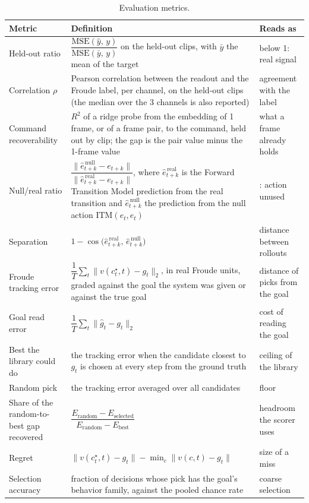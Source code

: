\documentclass[12pt,a4paper,oneside]{report}
\begin{document}
\begin{table}[H]
\centering
\footnotesize
\setlength{\tabcolsep}{6pt}
\renewcommand{\arraystretch}{1.5}
\caption{Evaluation metrics.}
\label{tab:eval-metrics}
\begin{tabularx}{\textwidth}{>{\hsize}Y>{\hsize}Y>{\hsize}Y}
\toprule
\textbf{Metric} & \textbf{Definition} & \textbf{Reads as}\\
\midrule
Held-out ratio & $\dfrac{\mathrm{MSE}(\hat y,\, y)}{\mathrm{MSE}(\bar y,\, y)}$ on the held-out clips, with $\bar y$ the mean of the target & below 1: real signal\\
\addlinespace[3pt]
Correlation $\rho$ & Pearson correlation between the readout and the Froude label, per channel, on the held-out clips (the median over the 3 channels is also reported) & agreement with the label\\
\addlinespace[3pt]
Command recoverability & $R^2$ of a ridge probe from the embedding of 1 frame, or of a frame pair, to the command, held out by clip; the gap is the pair value minus the 1-frame value & what a frame already holds\\
\addlinespace[3pt]
Null/real ratio & $\dfrac{\lVert \hat e^{\,\mathrm{null}}_{t+k} - e_{t+k}\rVert}{\lVert \hat e^{\,\mathrm{real}}_{t+k} - e_{t+k}\rVert}$, where $\hat e^{\,\mathrm{real}}_{t+k}$ is the Forward Transition Model prediction from the real transition and $\hat e^{\,\mathrm{null}}_{t+k}$ the prediction from the null action $\mathrm{ITM}(e_t, e_t)$ & 1.0: action unused\\
\addlinespace[3pt]
Separation & $1-\cos\big(\hat e^{\,\mathrm{real}}_{t+k},\, \hat e^{\,\mathrm{null}}_{t+k}\big)$ & distance between rollouts\\
\addlinespace[3pt]
Froude tracking error & $\dfrac{1}{T}\sum_{t}\big\lVert v(c^{\star}_t, t) - g_t\big\rVert_2$, in real Froude units, graded against the goal the system was given or against the true goal & distance of picks from the goal\\
\addlinespace[3pt]
Goal read error & $\dfrac{1}{T}\sum_{t}\big\lVert \hat g_t - g_t\big\rVert_2$ & cost of reading the goal\\
\addlinespace[3pt]
Best the library could do & the tracking error when the candidate closest to $g_t$ is chosen at every step from the ground truth & ceiling of the library\\
\addlinespace[3pt]
Random pick & the tracking error averaged over all candidates & floor\\
\addlinespace[3pt]
Share of the random-to-best gap recovered & $\dfrac{E_{\text{random}} - E_{\text{selected}}}{E_{\text{random}} - E_{\text{best}}}$ & headroom the scorer uses\\
\addlinespace[3pt]
Regret & $\lVert v(c^{\star}_t, t) - g_t\rVert - \min_c \lVert v(c, t) - g_t\rVert$ & size of a miss\\
\addlinespace[3pt]
Selection accuracy & fraction of decisions whose pick has the goal's behavior family, against the pooled chance rate & coarse selection\\
\bottomrule
\end{tabularx}
\end{table}
\end{document}
